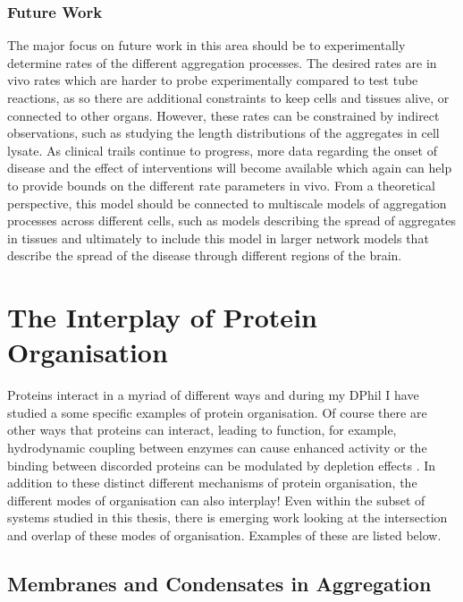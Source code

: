 \subsubsection{Future Work}

The major focus on future work in this area should be to experimentally determine rates of the different aggregation processes. The desired rates are in vivo rates which are harder to probe experimentally compared to test tube reactions, as so there are additional constraints to keep cells and tissues alive, or connected to other organs. However, these rates can be constrained by indirect observations, such as studying the length distributions of the aggregates in cell lysate. As clinical trails continue to progress, more data regarding the onset of disease and the effect of interventions will become available which again can help to provide bounds on the different rate parameters in vivo. From a theoretical perspective, this model should be connected to multiscale models of aggregation processes across different cells, such as models describing the spread of aggregates in tissues and ultimately to include this model in larger network models that describe the spread of the disease through different regions of the brain.

\section{The Interplay of Protein Organisation}

Proteins interact in a myriad of different ways and during my DPhil I have studied a some specific examples of protein organisation. Of course there are other ways that proteins can interact, leading to function, for example, hydrodynamic coupling between enzymes can cause enhanced activity \cite{agudo-canalejo_synchronization_2021, chatzittofi_topological_2024} or the binding between discorded proteins can be modulated by depletion effects \cite{zosel_depletion_2020, asakura_interaction_1954}. In addition to these distinct different mechanisms of protein organisation, the different modes of organisation can also interplay! Even within the subset of systems studied in this thesis, there is emerging work looking at the intersection and overlap of these modes of organisation. Examples of these are listed below.

\subsection{Membranes and Condensates in Aggregation}

